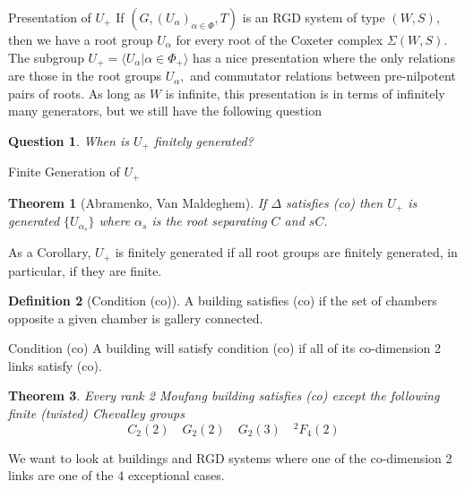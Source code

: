 \documentclass[xcolor=dvipsnames]{beamer}
\newtheorem{ques}{Question}
\newtheorem{Theo}{Theorem}
\theoremstyle{definition}
\newtheorem{defn}[Theo]{Definition}
\begin{document}
\begin{frame}{Presentation of $U_+$}
	If $(G,(U_\alpha)_{\alpha\in \Phi},T)$ is an RGD system of type $(W,S),$ then we have a root group $U_\alpha$ for every root of the Coxeter complex $\Sigma(W,S).$\\
	\pause
	\bigskip
	The subgroup $U_+=\langle U_\alpha|\alpha\in \Phi_+\rangle$ has a nice presentation where the only relations are those in the root groups $U_\alpha,$ and commutator relations between pre-nilpotent pairs of roots. As long as $W$ is infinite, this presentation is in terms of infinitely many generators, but we still have the following question
	\pause
	\begin{ques}
		When is $U_+$ finitely generated?		
	\end{ques}
\end{frame}

\begin{frame}{Finite Generation of $U_+$}
	\begin{Theo}[Abramenko, Van Maldeghem]
		If $\Delta$ satisfies (co) then $U_+$ is generated $\{U_{\alpha_s}\}$ where $\alpha_s$ is the root separating $C$ and $sC.$
\end{Theo}
\bigskip
\pause
As a Corollary, $U_+$ is finitely generated if all root groups are finitely generated, in particular, if they are finite.\\
\bigskip
\pause
\begin{defn}[Condition (co)]
A building satisfies (co) if the set of chambers opposite a given chamber is gallery connected.
\end{defn}
\end{frame}

\begin{frame}{Condition (co)}
A building will satisfy condition (co) if all of its co-dimension 2 links satisfy (co).
\bigskip
\pause
\begin{Theo}
	Every rank 2 Moufang building satisfies (co) except the following finite (twisted) Chevalley groups
	\[
		C_2(2)\quad G_2(2)\quad G_2(3) \quad {}^2F_4(2)
	\]
\end{Theo}
\pause
\bigskip
We want to look at buildings and RGD systems where one of the co-dimension 2 links are one of the 4 exceptional cases.
\end{frame}
\end{document}
